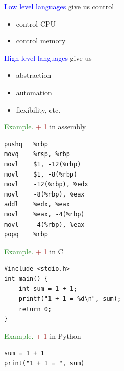 \documentclass[
    xcolor={svgnames,dvipsnames},
    hyperref={colorlinks, citecolor=DeepPink4, linkcolor=DarkRed, urlcolor=DarkBlue}
    ]{beamer}  %
\newcommand{\Eg}{\textcolor{ForestGreen}{Example. }}
\newcommand{\brown}[1]{\textcolor{Brown}{\sf #1}}
\newcommand{\blue}[1]{\textcolor{Blue}{\sf #1}}
\newcommand{\1}{\mathbbm 1}
\begin{document}
\begin{frame}
    
    \blue{Low level languages} give us control 

    \begin{itemize}
        \item control CPU
        \item control memory
    \end{itemize}

    \vspace{0.5em}
    \vspace{0.5em}
    \vspace{0.5em}

    \blue{High level languages} give us 
    \begin{itemize}
        \item abstraction
        \item automation
        \item flexibility, etc.
    \end{itemize}

\end{frame}




\begin{frame}[fragile]

    \Eg \brown{1 + 1} in assembly

    {\small
    \begin{verbatim}
pushq   %rbp
movq    %rsp, %rbp
movl    $1, -12(%rbp)
movl    $1, -8(%rbp)
movl    -12(%rbp), %edx
movl    -8(%rbp), %eax
addl    %edx, %eax
movl    %eax, -4(%rbp)
movl    -4(%rbp), %eax
popq    %rbp
    \end{verbatim}
    }

\end{frame}


\begin{frame}[fragile]

    \Eg \brown{1 + 1} in C

    {\small
    \begin{verbatim}
#include <stdio.h>
int main() {
    int sum = 1 + 1;
    printf("1 + 1 = %d\n", sum);
    return 0;
}   
    \end{verbatim}
    }

\end{frame}

\begin{frame}[fragile]

    \Eg \brown{1 + 1} in Python

    {\small
    \begin{verbatim}
sum = 1 + 1
print("1 + 1 = ", sum)
    \end{verbatim}
    }

\end{frame}
\end{document}
